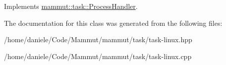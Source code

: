 Implements \hyperlink{classmammut_1_1task_1_1ProcessHandler_aad1791569e9f48ef5559ceeb897e7a1a}{mammut\-::task\-::\-Process\-Handler}.



The documentation for this class was generated from the following files\-:\begin{DoxyCompactItemize}
\item 
/home/daniele/\-Code/\-Mammut/mammut/task/task-\/linux.\-hpp\item 
/home/daniele/\-Code/\-Mammut/mammut/task/task-\/linux.\-cpp\end{DoxyCompactItemize}
